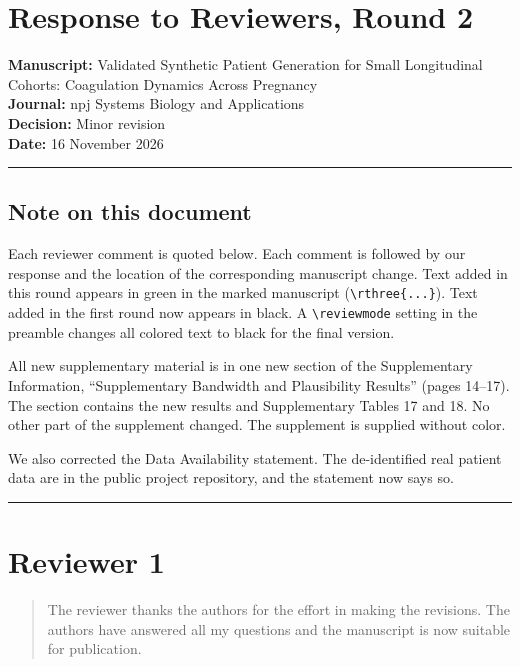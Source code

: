 \documentclass[
  11pt,
  letterpaper,
]{article}
\author{}
\date{}
\begin{document}
\section{Response to Reviewers, Round
2}\label{response-to-reviewers-round-2}

\textbf{Manuscript:} Validated Synthetic Patient Generation for Small
Longitudinal Cohorts: Coagulation Dynamics Across Pregnancy\\
\textbf{Journal:} npj Systems Biology and Applications\\
\textbf{Decision:} Minor revision\\
\textbf{Date:} 16 November 2026

\begin{center}\rule{0.5\linewidth}{0.5pt}\end{center}

\subsection{Note on this document}\label{note-on-this-document}

Each reviewer comment is quoted below. Each comment is followed by our
response and the location of the corresponding manuscript change. Text
added in this round appears in green in the marked manuscript
(\texttt{\textbackslash{}rthree\{...\}}). Text added in the first round
now appears in black. A \texttt{\textbackslash{}reviewmode} setting in
the preamble changes all colored text to black for the final version.

All new supplementary material is in one new section of the
Supplementary Information, ``Supplementary Bandwidth and Plausibility
Results'' (pages 14--17). The section contains the new results and
Supplementary Tables 17 and 18. No other part of the supplement changed.
The supplement is supplied without color.

We also corrected the Data Availability statement. The de-identified
real patient data are in the public project repository, and the
statement now says so.

\begin{center}\rule{0.5\linewidth}{0.5pt}\end{center}

\section{Reviewer 1}\label{reviewer-1}

\begin{quote}
The reviewer thanks the authors for the effort in making the revisions.
The authors have answered all my questions and the manuscript is now
suitable for publication.
\end{quote}
\end{document}
